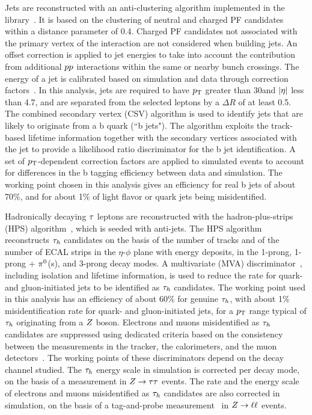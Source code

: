 Jets are reconstructed with an anti-\kt clustering algorithm implemented
in the \FASTJET library~\cite{Cacciari:2011ma, Cacciari:fastjet2}.
It is based on the clustering of neutral and charged PF candidates within a distance parameter of 0.4. Charged PF candidates
not associated with the primary vertex of the interaction
are not considered when building jets. An offset correction is applied to jet energies to take into account the contribution from additional $pp$ interactions within the same or nearby bunch crossings. The energy of a jet is calibrated based on simulation and
data through correction factors~\cite{CMS-JME-10-011}.
In this analysis, jets are required to
have $p_\mathrm{T}$ greater than 30\GeV and $\lvert\eta\rvert$ less than 4.7, and
are separated from the selected leptons by a $\Delta R$ of at least 0.5.
The combined secondary vertex (CSV) algorithm is used to identify jets that are likely to originate from a b quark (``b jets"). The algorithm exploits the track-based lifetime information together with the secondary vertices associated with the jet to provide a likelihood ratio discriminator for the b jet identification. A set of $p_\mathrm{T}$-dependent correction
factors are applied to simulated events to account for differences in the b tagging efficiency
between data and simulation. The working point chosen in this analysis gives an efficiency for real b jets of about 70\%, and for about 1\% of light flavor or quark jets being misidentified.

Hadronically decaying $\tau$ leptons
are reconstructed with the hadron-plus-strips (HPS)
algorithm~\cite{Khachatryan:2015dfa, CMS-PAS-TAU-16-002}, which is
seeded with anti-\kt jets.
The HPS algorithm reconstructs $\tau_{h}$ candidates on the basis of the
number of tracks and of the number of ECAL strips in the $\eta$-$\phi$ plane with energy deposits, in the 1-prong,
1-prong + $\pi^{0}$(s), and 3-prong decay modes. A
multivariate (MVA) discriminator~\cite{Hocker:2007ht}, including isolation
and lifetime information, is used to reduce the rate for  quark- and gluon-initiated jets
to be identified as $\tau_{h}$ candidates. The working point used in this analysis
has an efficiency of about 60\% for genuine $\tau_{h}$,
with about 1\% misidentification rate for quark- and gluon-initiated jets, for a $p_\mathrm{T}$ range typical of $\tau_{h}$ originating from a $Z$ boson.
Electrons and muons misidentified as $\tau_{h}$ candidates are suppressed using dedicated criteria
based on the consistency between the measurements in the tracker, the calorimeters, and the muon detectors~\cite{Khachatryan:2015dfa, CMS-PAS-TAU-16-002}.
The working points of these discriminators depend on the
decay channel studied.
The $\tau_{h}$ energy scale in simulation is corrected per decay mode, on the basis of a measurement in $Z\to\tau\tau$ events. The rate and the
energy scale of electrons and muons misidentified as $\tau_{h}$ candidates are also corrected in simulation, on the basis of a tag-and-probe measurement~\cite{CMS:2011aa} in $Z\to\ell\ell$ events.

